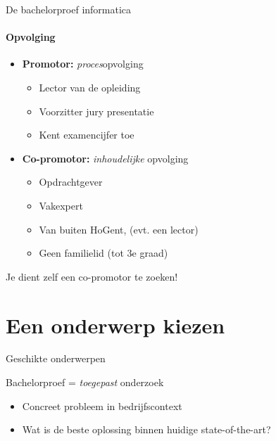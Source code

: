 \documentclass[usenames,dvipsnames]{beamer}
\begin{document}
\begin{frame}{De bachelorproef informatica}
  \framesubtitle{Opvolging}
  
  \begin{itemize}
    \item \textbf{Promotor:} \emph{proces}opvolging
    \begin{itemize}
      \item Lector van de opleiding
      \item Voorzitter jury presentatie
      \item Kent examencijfer toe
    \end{itemize}
    \item \textbf{Co-promotor:} \emph{inhoudelijke} opvolging
    \begin{itemize}
      \item Opdrachtgever
      \item Vakexpert
      \item Van buiten HoGent, (evt. een lector)
      \item Geen familielid (tot 3e graad)
    \end{itemize}
  \end{itemize}

Je dient zelf een co-promotor te zoeken!

\end{frame}

\section{Een onderwerp kiezen}
\sectionframe{}

\begin{frame}{Geschikte onderwerpen}

  Bachelorproef = \emph{toegepast} onderzoek
  
  \begin{itemize}
    \item Concreet probleem in bedrijfscontext
    \item Wat is de beste oplossing binnen huidige state-of-the-art?
  \end{itemize}

\end{frame}
\end{document}
